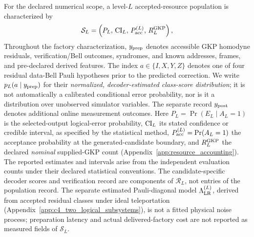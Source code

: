 \documentclass[aps,
prx,
superscriptaddress,
reprint,
longbibliography,
floatfix]{revtex4-2}
\begin{document}
For the declared numerical scope, a level-$L$ accepted-resource population is characterized by
\begin{equation}
\mathcal S_L=\left(P_L,\,{\rm CI}_L,\,P_{\rm acc}^{(L)},\,R_L^{\rm GKP}\right),
\label{eq:logical_resource_performance_record}
\end{equation}
Throughout the factory characterization, $y_{\rm prep}$ denotes accessible GKP homodyne residuals, verification/Bell outcomes, syndromes, and known addresses, frames, and pre-declared derived features. The index $a\in\{I,X,Y,Z\}$ denotes one of four residual data-Bell Pauli hypotheses prior to the predicted correction. We write $p_L(a\mid y_{\rm prep})$ for their \emph{normalized, decoder-estimated class-score distribution}; it is not automatically a calibrated conditional error probability, nor is it a distribution over unobserved simulator variables. The separate record $y_{\rm post}$ denotes additional online measurement outcomes.
Here $P_L=\Pr(E_L\mid A_L=1)$ is the selected-output logical-error probability, ${\rm CI}_L$ its stated confidence or credible interval, as specified by the statistical method, $P_{\rm acc}^{(L)}=\Pr(A_L=1)$ the acceptance probability at the generated-candidate boundary, and $R_L^{\rm GKP}$ the declared \emph{nominal} supplied-GKP count (Appendix~\ref{app:resource_accounting}). The reported estimates and intervals arise from the independent evaluation counts under their declared statistical conventions. The candidate-specific decoder scores and verification record are components of $\mathcal R_L$, not entries of the population record. The separate estimated Pauli-diagonal model $\Lambda_{\rm LR}^{(L)}$, derived from accepted residual classes under ideal teleportation (Appendix~\ref{app:c4_two_logical_subsystems}), is not a fitted physical noise process; preparation latency and actual delivered-factory cost are not reported as measured fields of $\mathcal S_L$.
\end{document}
